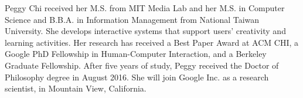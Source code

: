\markboth{}{}

Peggy Chi received her M.S. from MIT Media Lab and her M.S. in Computer Science and B.B.A. in Information Management from National Taiwan University. She develops interactive systems that support users' creativity and learning activities. Her research has received a Best Paper Award at ACM CHI, a Google PhD Fellowship in Human-Computer Interaction, and a Berkeley Graduate Fellowship.
%
After five years of study, Peggy received the Doctor of Philosophy degree in August 2016. She will join Google Inc. as a research scientist, in Mountain View, California.

